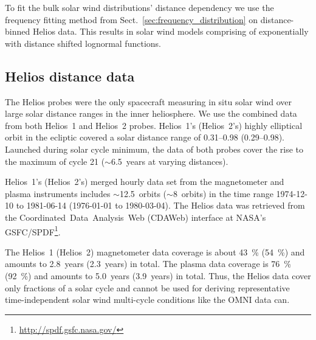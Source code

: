 To fit the bulk solar wind distributions' distance dependency we use the frequency fitting method from Sect.~\ref{sec:frequency_distribution} on distance-binned Helios data. This results in solar wind models comprising of exponentially with distance shifted lognormal functions.

\subsection{Helios distance data}
\label{sec:helios_distance_data}

The Helios probes were the only spacecraft measuring in situ solar wind over large solar distance ranges in the inner heliosphere. We use the combined data from both Helios~1 and Helios~2 probes. Helios~1's (Helios~2's) highly elliptical orbit in the ecliptic covered a solar distance range of \SIrange{0.31}{0.98}{\au} (\SIrange{0.29}{0.98}{\au}). Launched during solar cycle minimum, the data of both probes cover the rise to the maximum of cycle 21 ($\sim$6.5~years at varying distances).

Helios~1's (Helios~2's) merged hourly data set from the magnetometer and plasma instruments \citep{Rosenbauer1977} includes $\sim$12.5~orbits ($\sim$8~orbits) in the time range \mbox{1974-12-10} to \mbox{1981-06-14} (\mbox{1976-01-01} to \mbox{1980-03-04}).
The Helios data was retrieved from the Coordinated~Data~Analysis~Web (CDAWeb) interface at NASA's GSFC/SPDF\footnote{\url{http://spdf.gsfc.nasa.gov/}}.

The Helios~1 (Helios~2) magnetometer data coverage is about 43~\% (54~\%) and amounts to 2.8~years (2.3~years) in total. The plasma data coverage is 76~\% (92~\%) and amounts to 5.0~years (3.9~years) in total.
Thus, the Helios data cover only fractions of a solar cycle and cannot be used for deriving representative time-independent solar wind multi-cycle conditions like the OMNI data can.

